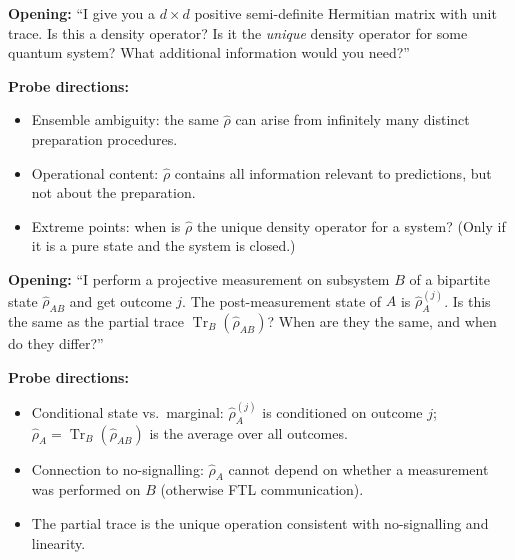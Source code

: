 \documentclass[11pt,a4paper]{article}
\begin{document}

\bigskip

\begin{tcolorbox}[researchbox, title={ORQ 1 --- Foundations}]

\textbf{Opening:}
``I give you a $d\times d$ positive semi-definite Hermitian matrix with unit trace.
Is this a density operator? Is it the \emph{unique} density operator for some
quantum system? What additional information would you need?''

\medskip\textbf{Probe directions:}
\begin{itemize}[leftmargin=1.5em, itemsep=3pt]
  \item Ensemble ambiguity: the same $\hat{\rho}$ can arise from infinitely many
        distinct preparation procedures.
  \item Operational content: $\hat{\rho}$ contains all information relevant to
        predictions, but not about the preparation.
  \item Extreme points: when is $\hat{\rho}$ the unique density operator for a system?
        (Only if it is a pure state and the system is closed.)
\end{itemize}
\end{tcolorbox}

\bigskip

\begin{tcolorbox}[researchbox, title={ORQ 2 --- Partial Trace}]

\textbf{Opening:}
``I perform a projective measurement on subsystem $B$ of a bipartite state
$\hat{\rho}_{AB}$ and get outcome $j$. The post-measurement state of $A$ is
$\hat{\rho}_A^{(j)}$. Is this the same as the partial trace $\operatorname{Tr}_B(\hat{\rho}_{AB})$?
When are they the same, and when do they differ?''

\medskip\textbf{Probe directions:}
\begin{itemize}[leftmargin=1.5em, itemsep=3pt]
  \item Conditional state vs.\ marginal: $\hat{\rho}_A^{(j)}$ is conditioned on
        outcome $j$; $\hat{\rho}_A=\operatorname{Tr}_B(\hat{\rho}_{AB})$ is the average
        over all outcomes.
  \item Connection to no-signalling: $\hat{\rho}_A$ cannot depend on whether
        a measurement was performed on $B$ (otherwise FTL communication).
  \item The partial trace is the unique operation consistent with no-signalling
        and linearity.
\end{itemize}
\end{tcolorbox}
\end{document}
